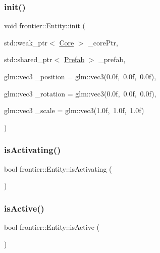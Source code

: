 \mbox{\label{classfrontier_1_1_entity_aba15243f8a661c4c9248e405fd869894}} 
\subsubsection{\texorpdfstring{init()}{init()}\hspace{0.1cm}{\footnotesize\ttfamily [3/3]}}
{\footnotesize\ttfamily void frontier\+::\+Entity\+::init (\begin{DoxyParamCaption}\item[{std\+::weak\+\_\+ptr$<$ \hyperlink{classfrontier_1_1_core}{Core} $>$}]{\+\_\+core\+Ptr,  }\item[{std\+::shared\+\_\+ptr$<$ \hyperlink{classfrontier_1_1_prefab}{Prefab} $>$}]{\+\_\+prefab,  }\item[{glm\+::vec3}]{\+\_\+position = {\ttfamily glm\+:\+:vec3(0.0f,~0.0f,~0.0f)},  }\item[{glm\+::vec3}]{\+\_\+rotation = {\ttfamily glm\+:\+:vec3(0.0f,~0.0f,~0.0f)},  }\item[{glm\+::vec3}]{\+\_\+scale = {\ttfamily glm\+:\+:vec3(1.0f,~1.0f,~1.0f)} }\end{DoxyParamCaption})}

\mbox{\label{classfrontier_1_1_entity_a4de39f3a34645051d7d223b3f744761c}} 
\subsubsection{\texorpdfstring{is\+Activating()}{isActivating()}}
{\footnotesize\ttfamily bool frontier\+::\+Entity\+::is\+Activating (\begin{DoxyParamCaption}{ }\end{DoxyParamCaption})}

\mbox{\label{classfrontier_1_1_entity_a1b19a21c357e557a3c12b6257d21ff09}} 
\subsubsection{\texorpdfstring{is\+Active()}{isActive()}}
{\footnotesize\ttfamily bool frontier\+::\+Entity\+::is\+Active (\begin{DoxyParamCaption}{ }\end{DoxyParamCaption})}

